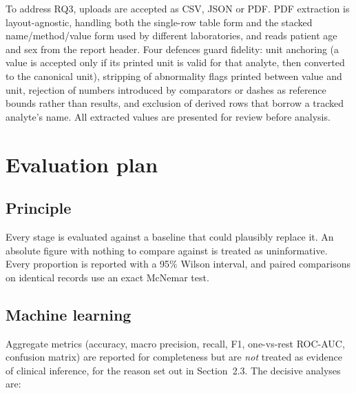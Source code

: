 \documentclass[11pt,a4paper]{article}
\begin{document}
To address RQ3, uploads are accepted as CSV, JSON or PDF. PDF extraction is
layout-agnostic, handling both the single-row table form and the stacked
name/method/value form used by different laboratories, and reads patient age and
sex from the report header. Four defences guard fidelity: unit anchoring (a value
is accepted only if its printed unit is valid for that analyte, then converted to
the canonical unit), stripping of abnormality flags printed between value and unit,
rejection of numbers introduced by comparators or dashes as reference bounds rather
than results, and exclusion of derived rows that borrow a tracked analyte's name.
All extracted values are presented for review before analysis.

\section{Evaluation plan}

\subsection{Principle}

Every stage is evaluated against a baseline that could plausibly replace it. An
absolute figure with nothing to compare against is treated as uninformative. Every
proportion is reported with a 95\% Wilson interval, and paired comparisons on
identical records use an exact McNemar test.

\subsection{Machine learning}

Aggregate metrics (accuracy, macro precision, recall, F1, one-vs-rest ROC-AUC,
confusion matrix) are reported for completeness but are \emph{not} treated as
evidence of clinical inference, for the reason set out in Section~2.3. The decisive
analyses are:
\end{document}
